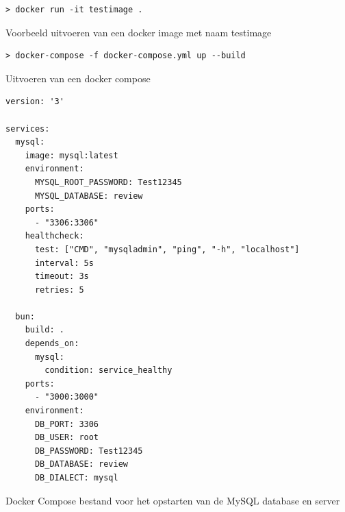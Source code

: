 \begin{listing}[H]
  \centering
  \begin{verbatim}
> docker run -it testimage .
      \end{verbatim}
      \caption{\label{code:dockerrun}Voorbeeld uitvoeren van een docker image met naam testimage}
\end{listing}

\begin{listing}[H]
  \centering
  \begin{verbatim}
> docker-compose -f docker-compose.yml up --build
      \end{verbatim}
      \caption{\label{code:dockercompose}Uitvoeren van een docker compose}
\end{listing}
\begin{listing}[H]
  \centering
  \begin{verbatim}
version: '3'

services:
  mysql:
    image: mysql:latest
    environment:
      MYSQL_ROOT_PASSWORD: Test12345
      MYSQL_DATABASE: review
    ports:
      - "3306:3306"
    healthcheck:
      test: ["CMD", "mysqladmin", "ping", "-h", "localhost"]
      interval: 5s
      timeout: 3s
      retries: 5

  bun:
    build: .
    depends_on:
      mysql:
        condition: service_healthy
    ports:
      - "3000:3000"
    environment:
      DB_PORT: 3306
      DB_USER: root
      DB_PASSWORD: Test12345
      DB_DATABASE: review
      DB_DIALECT: mysql
      \end{verbatim}
      \caption{\label{code:dockercomposefile}Docker Compose bestand voor het opstarten van de MySQL database en server}
\end{listing}
